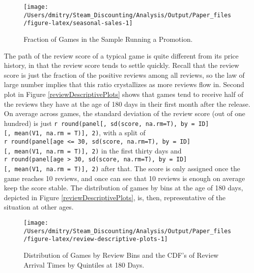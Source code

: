 \documentclass[
  12pt,
  pagebackref]{article}
\begin{document}
\begin{figure}[h]

{\centering \texttt{[image: /Users/dmitry/Steam\_Discounting/Analysis/Output/Paper\_files/figure-latex/seasonal-sales-1]} 

}

\caption{\label{seasonalSales} Fraction of Games in the Sample Running a Promotion.}\label{fig:seasonal-sales}
\end{figure}

The path of the review score of a typical game is quite different from
its price history, in that the review score tends to settle quickly.
Recall that the review score is just the fraction of the positive
reviews among all reviews, so the law of large number implies that this
ratio crystallizes as more reviews flow in. Second plot in Figure
\ref{reviewDescriptivePlots} shows that games tend to receive half of
the reviews they have at the age of 180 days in their first month after
the release. On average across games, the standard deviation of the
review score (out of one hundred) is just
\texttt{r\ round(panel{[},\ sd(score,\ na.rm=T),\ by\ =\ ID{]}{[},\ mean(V1,\ na.rm\ =\ T){]},\ 2)},
with a split of
\texttt{r\ round(panel{[}age\ \textless{}=\ 30,\ sd(score,\ na.rm=T),\ by\ =\ ID{]}{[},\ mean(V1,\ na.rm\ =\ T){]},\ 2)}
in the first thirty days and
\texttt{r\ round(panel{[}age\ \textgreater{}\ 30,\ sd(score,\ na.rm=T),\ by\ =\ ID{]}{[},\ mean(V1,\ na.rm\ =\ T){]},\ 2)}
after that. The score is only assigned once the game reaches 10 reviews,
and once can see that 10 reviews is enough on average keep the score
stable. The distribution of games by bins at the age of 180 days,
depicted in Figure \ref{reviewDescriptivePlots}, is, then,
representative of the situation at other ages.

\begin{figure}[h]

{\centering \texttt{[image: /Users/dmitry/Steam\_Discounting/Analysis/Output/Paper\_files/figure-latex/review-descriptive-plots-1]} 

}

\caption{\label{reviewDescriptivePlots} Distribution of Games by Review Bins and the CDF's of Review Arrival Times by Quintiles at 180 Days.}\label{fig:review-descriptive-plots}
\end{figure}
\end{document}
